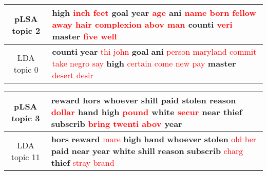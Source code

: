 \begin{center}\begin{tabularx}{\textwidth} {
  | c | >{\raggedright\arraybackslash}X | } \hline 
pLSA topic 2 & \textbf{high} \textcolor{red}{inch} \textcolor{red}{feet} \textbf{goal} \textbf{year} \textcolor{red}{age} \textbf{ani} \textcolor{red}{name} \textcolor{red}{born} \textcolor{red}{fellow} \textcolor{red}{away} \textcolor{red}{hair} \textcolor{red}{complexion} \textcolor{red}{abov} \textcolor{red}{man} \textbf{counti} \textcolor{red}{veri} \textbf{master} \textcolor{red}{five} \textcolor{red}{well} \\ \hline 
LDA topic 0 & \textbf{counti} \textbf{year} \textcolor{red}{thi} \textcolor{red}{john} \textbf{goal} \textbf{ani} \textcolor{red}{person} \textcolor{red}{maryland} \textcolor{red}{commit} \textcolor{red}{take} \textcolor{red}{negro} \textcolor{red}{say} \textbf{high} \textcolor{red}{certain} \textcolor{red}{come} \textcolor{red}{new} \textcolor{red}{pay} \textbf{master} \textcolor{red}{desert} \textcolor{red}{desir} \\ \hline 
\end{tabularx}

\end{center}

\begin{center}\begin{tabularx}{\textwidth} {
  | c | >{\raggedright\arraybackslash}X | } \hline 
pLSA topic 3 & \textbf{reward} \textbf{hors} \textbf{whoever} \textbf{shill} \textbf{paid} \textbf{stolen} \textbf{reason} \textcolor{red}{dollar} \textbf{hand} \textbf{high} \textcolor{red}{pound} \textbf{white} \textcolor{red}{secur} \textbf{near} \textbf{thief} \textbf{subscrib} \textcolor{red}{bring} \textcolor{red}{twenti} \textcolor{red}{abov} \textbf{year} \\ \hline 
LDA topic 11 & \textbf{hors} \textbf{reward} \textcolor{red}{mare} \textbf{high} \textbf{hand} \textbf{whoever} \textbf{stolen} \textcolor{red}{old} \textcolor{red}{her} \textbf{paid} \textbf{near} \textbf{year} \textbf{white} \textbf{shill} \textbf{reason} \textbf{subscrib} \textcolor{red}{charg} \textbf{thief} \textcolor{red}{stray} \textcolor{red}{brand} \\ \hline 
\end{tabularx}

\end{center}

